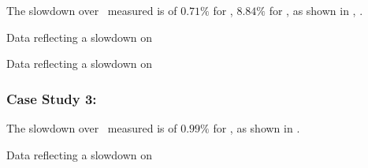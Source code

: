 The slowdown over \llvm\ measured is of $0.71 \%$ for \bzip, $8.84 \%$ for \gzip, as shown in , .

\begin{table}
  \centering
  \begin{tiny}
  
  \end{tiny}
  \caption{Data reflecting a slowdown on \bzip}
  \label{tab:slowdownb}
\end{table}

\begin{table}
  \centering
  \begin{tiny}
  
  \end{tiny}
  \caption{Data reflecting a slowdown on \gzip}
  \label{tab:slowdownz}
\end{table}

\subsubsection{Case Study 3: \gobmk}

The slowdown over \llvm\ measured is of $0.99 \%$ for \gobmk, as shown in .

\begin{table}
  \centering
  \begin{tiny}
  
  \end{tiny}
  \caption{Data reflecting a slowdown on \gobmk}
  \label{tab:slowdowngobmk}
\end{table}

